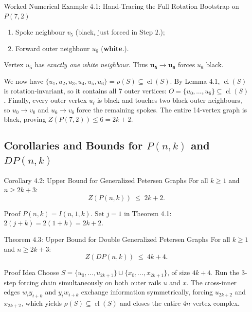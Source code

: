 \documentclass[11pt]{article}
\begin{document}
\begin{callbox}{Worked Numerical Example 4.1: Hand-Tracing the Full Rotation Bootstrap on $P(7,2)$}
\begin{itemize}[leftmargin=*,nosep]
\begin{enumerate}[leftmargin=*,nosep]
    \item Spoke neighbour $v_5$ (black, just forced in Step 2.);
    \item Forward outer neighbour $u_6$ (\textbf{white}.).
  \end{enumerate}
  Vertex $u_5$ has \emph{exactly one white neighbour}. Thus $\mathbf{u_5 \to u_6}$ forces $u_6$ black.
\end{itemize}
We now have $\{u_1, u_2, u_3, u_4, u_5, u_6\} = \rho(S) \subseteq \operatorname{cl}(S)$.
By Lemma 4.1, $\operatorname{cl}(S)$ is rotation-invariant, so it contains all 7 outer vertices: $O = \{u_0, \dots, u_6\} \subseteq \operatorname{cl}(S)$.
Finally, every outer vertex $u_i$ is black and touches two black outer neighbours, so $u_0 \to v_0$ and $u_6 \to v_6$ force the remaining spokes.
The entire 14-vertex graph is black, proving $Z(P(7,2)) \le 6 = 2k+2$.
\end{callbox}

\subsection{Corollaries and Bounds for $P(n,k)$ and $DP(n,k)$}

\begin{thmbox}{Corollary 4.2: Upper Bound for Generalized Petersen Graphs}
For all $k \ge 1$ and $n \ge 2k+3$:
\begin{equation}
  Z(P(n, k)) \;\le\; 2k + 2.
\end{equation}
\end{thmbox}
\begin{defbox}{Proof}
$P(n,k) = I(n, 1, k)$. Set $j=1$ in Theorem 4.1: $2(j+k) = 2(1+k) = 2k+2$. \qedhere
\end{defbox}

\begin{thmbox}{Theorem 4.3: Upper Bound for Double Generalized Petersen Graphs}
For all $k \ge 1$ and $n \ge 2k+3$:
\begin{equation}
  Z(DP(n, k)) \;\le\; 4k + 4.
\end{equation}
\end{thmbox}
\begin{defbox}{Proof Idea}
Choose $S = \{u_0, \dots, u_{2k+1}\} \cup \{x_0, \dots, x_{2k+1}\}$, of size $4k+4$. Run the 3-step forcing chain simultaneously on both outer rails $u$ and $x$. The cross-inner edges $w_i y_{i+k}$ and $y_i w_{i+k}$ exchange information symmetrically, forcing $u_{2k+2}$ and $x_{2k+2}$, which yields $\rho(S) \subseteq \operatorname{cl}(S)$ and closes the entire $4n$-vertex complex. \qedhere
\end{defbox}
\end{document}
